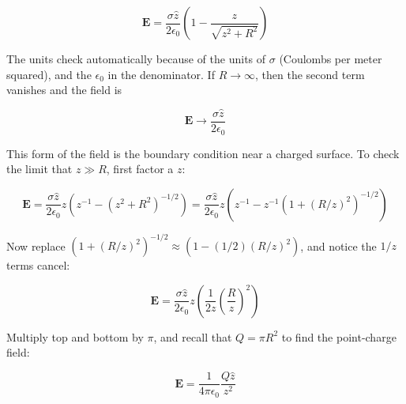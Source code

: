 \documentclass[10pt]{article}
\begin{document}
\begin{equation}
\mathbf{E} = \frac{\sigma \hat{z}}{2\epsilon_0}\left( 1 - \frac{z}{\sqrt{z^2 + R^2}}\right)
\end{equation}

The units check automatically because of the units of $\sigma$ (Coulombs per meter squared), and the $\epsilon_0$ in the denominator.  If $R \to \infty$, then the second term vanishes and the field is 

\begin{equation}
\mathbf{E} \to \frac{\sigma \hat{z}}{2\epsilon_0}
\end{equation}

This form of the field is the boundary condition near a charged surface.  To check the limit that $z \gg R$, first factor a $z$:

\begin{equation}
\mathbf{E} = \frac{\sigma \hat{z}}{2\epsilon_0} z \left( z^{-1} - (z^2 + R^2)^{-1/2}\right) = \frac{\sigma \hat{z}}{2\epsilon_0} z \left( z^{-1} - z^{-1} (1 + (R/z)^2)^{-1/2}\right)
\end{equation}

Now replace $(1+(R/z)^2)^{-1/2} \approx (1 - (1/2) (R/z)^2)$, and notice the $1/z$ terms cancel:

\begin{equation}
\mathbf{E} = \frac{\sigma \hat{z}}{2\epsilon_0}z\left( \frac{1}{2z} \left(\frac{R}{z}\right)^2 \right)
\end{equation}

Multiply top and bottom by $\pi$, and recall that $Q = \pi R^2$ to find the point-charge field:

\begin{equation}
\mathbf{E} = \frac{1}{4\pi\epsilon_0} \frac{Q \hat{z}}{z^2}
\end{equation}
\end{document}
